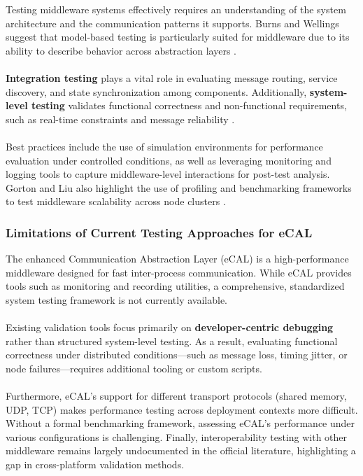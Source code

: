 Testing middleware systems effectively requires an understanding of the system architecture and the communication patterns it supports. Burns and Wellings suggest that model-based testing is particularly suited for middleware due to its ability to describe behavior across abstraction layers \cite{burns2009real}.
\\
\\
\textbf{Integration testing} plays a vital role in evaluating message routing, service discovery, and state synchronization among components. Additionally, \textbf{system-level testing} validates functional correctness and non-functional requirements, such as real-time constraints and message reliability \cite{gorton2006software}.
\\
\\
Best practices include the use of simulation environments for performance evaluation under controlled conditions, as well as leveraging monitoring and logging tools to capture middleware-level interactions for post-test analysis. Gorton and Liu also highlight the use of profiling and benchmarking frameworks to test middleware scalability across node clusters \cite{gorton2006software}.

\subsubsection{Limitations of Current Testing Approaches for eCAL}

The enhanced Communication Abstraction Layer (eCAL) is a high-performance middleware designed for fast inter-process communication. While eCAL provides tools such as monitoring and recording utilities, a comprehensive, standardized system testing framework is not currently available.
\\
\\
Existing validation tools focus primarily on \textbf{developer-centric debugging} rather than structured system-level testing. As a result, evaluating functional correctness under distributed conditions—such as message loss, timing jitter, or node failures—requires additional tooling or custom scripts.
\\
\\
Furthermore, eCAL's support for different transport protocols (shared memory, UDP, TCP) makes performance testing across deployment contexts more difficult. Without a formal benchmarking framework, assessing eCAL's performance under various configurations is challenging. Finally, interoperability testing with other middleware remains largely undocumented in the official literature, highlighting a gap in cross-platform validation methods.
